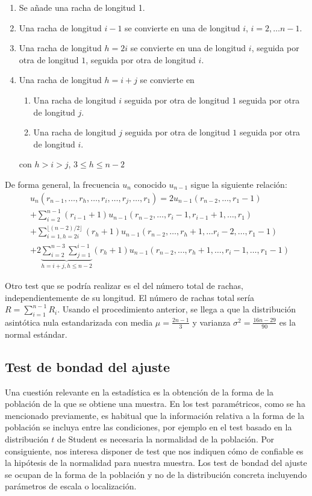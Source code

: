 \begin{enumerate}
	\item Se añade una racha de longitud 1.
	\item Una racha de longitud $i-1$ se convierte en una de longitud $i$, $i=2,\dots n-1$.
	\item Una racha de longitud $h=2i$ se convierte en una de longitud $i$, seguida por otra de longitud $1$, seguida por otra de longitud $i$.
	\item Una racha de longitud $h=i+j$ se convierte en
	\begin{enumerate}
		\item Una racha de longitud $i$ seguida por otra de longitud $1$ seguida por otra de longitud $j$.
		\item Una racha de longitud $j$ seguida por otra de longitud $1$ seguida por otra de longitud $i$.
	\end{enumerate}
	con $h>i>j$, $3 \leq h \leq n-2$
\end{enumerate}

	De forma general, la frecuencia $u_n$ conocido $u_{n-1}$ sigue la siguiente relación:
\begin{align*}
	& u_n (r_{n-1}, \dots, r_h, \dots, r_i, \dots, r_j, \dots, r_1)= 
		2 u_{n-1}(r_{n-2}, \dots, r_1-1) \\
	&+ \sum\limits_{i=2}^{n-1} 
		(r_{i-1} + 1)
		u_{n-1}(r_{n-2},\dots, r_i-1, r_{i-1}+1,\dots, r_1)\\
	&+ \sum\limits_{i=1, h=2i}^{\lfloor (n-2)/2 \rfloor} 
		(r_{h} + 1)
		u_{n-1}(r_{n-2},\dots, r_h+1,\dots r_i-2,\dots, r_1-1)\\
	&+ 2 \underbrace{\sum\limits_{i=2}^{n-3} \sum\limits_{j=1}^{i-1}}_{h=i+j, h \leq n-2}
		(r_{h} + 1)
		u_{n-1}(r_{n-2},\dots, r_h+1,\dots, r_i-1,\dots, r_1-1)			
\end{align*}
	
	Otro test que se podría realizar es el del número total de rachas, independientemente de su longitud. El número de rachas total sería $R = \sum\limits_{i=1}^{n-1} R_i$. Usando el procedimiento anterior, se llega a que la distribución asintótica nula estandarizada con media $\mu = \frac{2n-1}{3}$ y varianza $\sigma^2=\frac{16n-29}{90}$ es la normal estándar.
	
\subsection{Test de bondad del ajuste}

	Una cuestión relevante en la estadística es la obtención de la forma de la población de la que se obtiene una muestra. En los test paramétricos, como se ha mencionado previamente, es habitual que la información relativa a la forma de la población se incluya entre las condiciones, por ejemplo en el test basado en la distribución $t$ de Student es necesaria la normalidad de la población. Por consiguiente, nos interesa disponer de test que nos indiquen cómo de confiable es la hipótesis de la normalidad para nuestra muestra. Los test de bondad del ajuste se ocupan de la forma de la población y no de la distribución concreta incluyendo parámetros de escala o localización.
	
